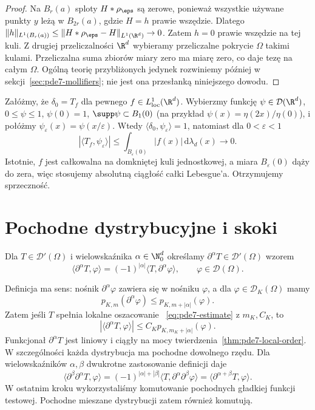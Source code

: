 \begin{proof}
Na $B_r(a)$ sploty $H*\rho_\eps$ są zerowe,
ponieważ wszystkie używane punkty $y$ leżą
w $B_{2r}(a)$, gdzie $H=h$ prawie wszędzie.
Dlatego $\|h\|_{L^1(B_r(a))}
\le\|H*\rho_\eps-H\|_{L^1(\R^d)}\to0$.
Zatem $h=0$ prawie wszędzie na tej kuli.
Z drugiej przeliczalności $\R^d$ wybieramy
przeliczalne pokrycie $\Omega$ takimi kulami.
Przeliczalna suma zbiorów miary zero ma miarę zero,
co daje tezę na całym $\Omega$.
Ogólną teorię przybliżonych jedynek rozwiniemy później
w sekcji~\ref{sec:pde7-mollifiers}; nie jest ona
przesłanką niniejszego dowodu.
\end{proof}

\begin{uwaga}
Załóżmy, że $\delta_0=T_f$ dla pewnego
$f\in L^1_{\mathrm{loc}}(\R^d)$. Wybierzmy funkcję
$\psi\in\mathcal D(\R^d)$, $0\le\psi\le1$,
$\psi(0)=1$, $\supp\psi\subset B_1(0)$
(na przykład $\psi(x)=\eta(2x)/\eta(0)$), i połóżmy
$\psi_\varepsilon(x)=\psi(x/\varepsilon)$.
Wtedy $\langle\delta_0,\psi_\varepsilon\rangle=1$,
natomiast dla $0<\varepsilon<1$
\[
 |\langle T_f,\psi_\varepsilon\rangle|
 \le\int_{B_\varepsilon(0)}|f(x)|\,\mathrm d\lambda_d(x)
 \longrightarrow0.
\]
Istotnie, $f$ jest całkowalna na domkniętej kuli
jednostkowej, a miara $B_\varepsilon(0)$ dąży do zera,
więc stosujemy absolutną ciągłość całki Lebesgue'a.
Otrzymujemy sprzeczność.
\end{uwaga}

\section{Pochodne dystrybucyjne i skoki}
\label{sec:pde7-derivatives}

\begin{definicja}
\label{def:pde7-derivative}
Dla $T\in\mathcal D'(\Omega)$ i wielowskaźnika
$\alpha\in\N_0^d$ określamy $\partial^\alpha T\in\mathcal D'(\Omega)$
wzorem
\begin{equation}\label{eq:pde7-distributional-derivative}
 \langle\partial^\alpha T,\varphi\rangle
 =(-1)^{|\alpha|}\langle T,\partial^\alpha\varphi\rangle,
 \qquad\varphi\in\mathcal D(\Omega).
\end{equation}
\end{definicja}

Definicja ma sens: nośnik $\partial^\alpha\varphi$
zawiera się w nośniku $\varphi$, a dla $\varphi\in\mathcal D_K(\Omega)$
mamy
\[
 p_{K,m}(\partial^\alpha\varphi)
 \le p_{K,m+|\alpha|}(\varphi).
\]
Zatem jeśli $T$ spełnia lokalne oszacowanie
~\eqref{eq:pde7-estimate} z $m_K,C_K$, to
\[
 |\langle\partial^\alpha T,\varphi\rangle|
 \le C_K p_{K,m_K+|\alpha|}(\varphi).
\]
Funkcjonał $\partial^\alpha T$ jest liniowy i ciągły
na mocy twierdzenia~\ref{thm:pde7-local-order}.
W szczególności każda dystrybucja ma pochodne
dowolnego rzędu. Dla wielowskaźników $\alpha,\beta$
dwukrotne zastosowanie definicji daje
\[
 \langle\partial^\beta\partial^\alpha T,\varphi\rangle
 =(-1)^{|\alpha|+|\beta|}
 \langle T,\partial^\alpha\partial^\beta\varphi\rangle
 =\langle\partial^{\alpha+\beta}T,\varphi\rangle.
\]
W ostatnim kroku wykorzystaliśmy komutowanie
pochodnych gładkiej funkcji testowej. Pochodne
mieszane dystrybucji zatem również komutują.

